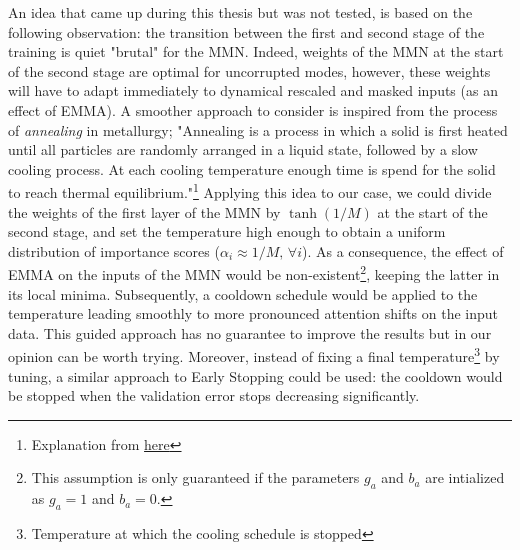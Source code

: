 An idea that came up during this thesis but was not tested, is based on the following observation: the transition between the first and second stage of the training is quiet "brutal" for the MMN. Indeed, weights of the MMN at the start of the second stage are optimal for uncorrupted modes, however, these weights will have to adapt immediately to dynamical rescaled and masked inputs (as an effect of EMMA). A smoother approach to consider is inspired from the process of \textit{annealing} in metallurgy; "Annealing is a process in which a solid is first heated until all particles are randomly arranged in a liquid state, followed by a slow cooling process. At each cooling temperature enough time is spend for the solid to reach thermal equilibrium."\footnote{Explanation from \href{http://www.iue.tuwien.ac.at/phd/binder/node87.html}{here}} Applying this idea to our case, we could divide the weights of the first layer of the MMN by $\tanh(1/M)$ at the start of the second stage, and set the temperature high enough to obtain a uniform distribution of importance scores ($\alpha_i \approx 1/M,\, \forall i$). As a consequence, the effect of EMMA on the inputs of the MMN would be non-existent\footnote{This assumption is only guaranteed if the parameters $g_a$ and $b_a$ are intialized as $g_a=1$ and $b_a=0$.}, keeping the latter in its local minima. Subsequently, a cooldown schedule would be applied to the temperature leading smoothly to more pronounced attention shifts on the input data. This guided approach has no guarantee to improve the results but in our opinion can be worth trying. Moreover, instead of fixing a final temperature\footnote{Temperature at which the cooling schedule is stopped} by tuning, a similar approach to Early Stopping could be used: the cooldown would be stopped when the validation error stops decreasing significantly.

